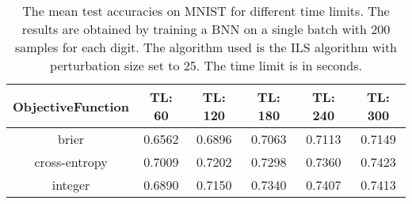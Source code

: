 \begin{center}
\begin{table}[H]
\centering
\begin{tabular}{|c|c|c|c|c|c|}
  \hline
ObjectiveFunction & TL: 60 & TL: 120 & TL: 180 & TL: 240 & TL: 300 \\ 
  \hline
brier & 0.6562 & 0.6896 & 0.7063 & 0.7113 & 0.7149 \\ 
   \hline
cross-entropy & 0.7009 & 0.7202 & 0.7298 & 0.7360 & 0.7423 \\ 
   \hline
integer & 0.6890 & 0.7150 & 0.7340 & 0.7407 & 0.7413 \\ 
   \hline
\end{tabular}
\caption{The mean test accuracies on MNIST for different time limits. The results are obtained by training a 
            BNN on a single batch with 200 samples for each digit. The algorithm used is the ILS algorithm
            with perturbation size set to 25. The time limit is in seconds.} 
\label{SBT_TETL_v2}
\end{table}

\end{center}

